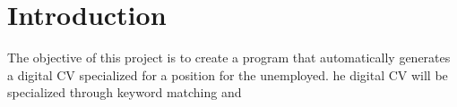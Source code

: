 \section{Introduction}\label{sec:introduction}

The objective of this project is to create a program that automatically generates a digital CV specialized for a position for the unemployed. 
he digital CV will be specialized through keyword matching and 
